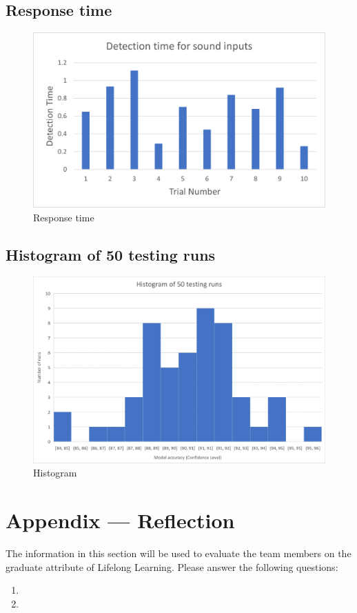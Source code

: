 \documentclass[12pt, titlepage]{article}
\begin{document}
\subsection*{Response time}
\begin{figure}[]
  \includegraphics[width=\textwidth,height=\textheight,keepaspectratio]{Responce_time.png}
  \caption{Response time}
  \label{Response} 
\end{figure}
\subsection*{Histogram of 50 testing runs}
\begin{figure}[]
  \includegraphics[width=\textwidth,height=\textheight,keepaspectratio]{confidence_level.png}
  \caption{Histogram}
  \label{Histogram} 
\end{figure}


\section*{Appendix --- Reflection}

The information in this section will be used to evaluate the team members on the
graduate attribute of Lifelong Learning.  Please answer the following questions:

\begin{enumerate}
  \item 
  \item 
\end{enumerate}
\end{document}
